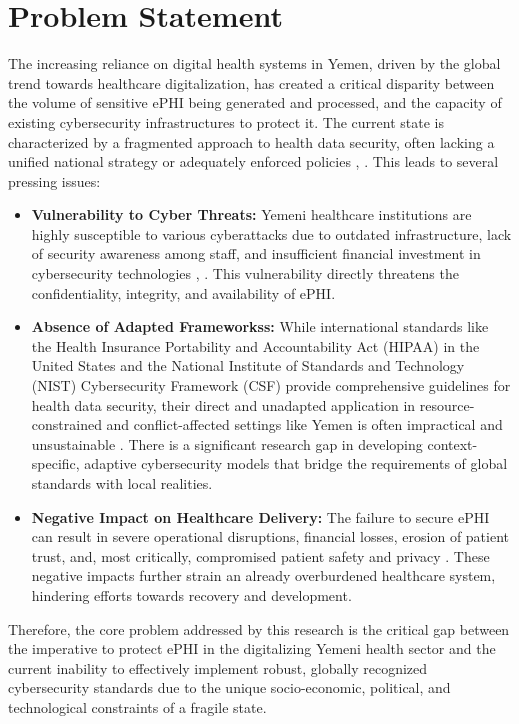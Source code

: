 \documentclass[12pt, a4paper, oneside]{report}
\begin{document}
	\section{Problem Statement} 
	The increasing reliance on digital health systems in Yemen, driven by the global trend towards healthcare digitalization, has created a critical disparity between the volume of sensitive ePHI being generated and processed, and the capacity of existing cybersecurity infrastructures to protect it. The current state is characterized by a fragmented approach to health data security, often lacking a unified national strategy or adequately enforced policies \cite{alhammadi2024advancing}, \cite{al2025political}. This leads to several pressing issues:
	\begin{itemize}
		\item{	\textbf{Vulnerability to Cyber Threats:} Yemeni healthcare institutions are highly susceptible to various cyberattacks due to outdated infrastructure, lack of security awareness among staff, and insufficient financial investment in cybersecurity technologies \cite{abdulrab2021assessing}, \cite{al2023information}. This vulnerability directly threatens the confidentiality, integrity, and availability of ePHI.}
		\item{\textbf{Absence of Adapted Frameworkss:} While international standards like the Health Insurance Portability and Accountability Act (HIPAA) in the United States and the National Institute of Standards and Technology (NIST) Cybersecurity Framework (CSF) provide comprehensive guidelines for health data security, their direct and unadapted application in resource-constrained and conflict-affected settings like Yemen is often impractical and unsustainable \cite{nist2024sp80066r2}. There is a significant research gap in developing context-specific, adaptive cybersecurity models that bridge the requirements of global standards with local realities.}
		\item{\textbf{Negative Impact on Healthcare Delivery:} The failure to secure ePHI can result in severe operational disruptions, financial losses, erosion of patient trust, and, most critically, compromised patient safety and privacy \cite{melaku2023context}. These negative impacts further strain an already overburdened healthcare system, hindering efforts towards recovery and development.}
	\end{itemize}
	Therefore, the core problem addressed by this research is the critical gap between the imperative to protect ePHI in the digitalizing Yemeni health sector and the current inability to effectively implement robust, globally recognized cybersecurity standards due to the unique socio-economic, political, and technological constraints of a fragile state.
	
\end{document}
